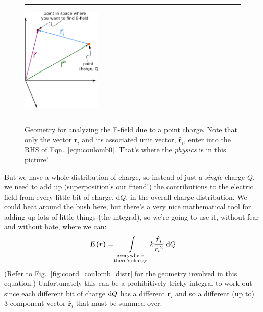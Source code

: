\documentclass[10pt,letterpaper,twoside]{article}
\begin{document}
\begin{figure}[htb]
  \centering
  \vspace{5pt}
  \hrule%
  \vspace{10pt}
	\centering
	\includegraphics[keepaspectratio=true,width=1.50in]{./coordinate_system_single_charge.pdf}
    \caption{Geometry for analyzing the E-field due to a point charge.
			 Note that only the vector $\bm r_i$ and its associated unit vector, $\bm{\hat r}_i$, enter into the RHS of Eqn.~\ref{eqn:coulomb0}.
			 That's where the \textit{physics} is in this picture!}
    \label{fig:coord_coulomb}
  \hrule%
\vspace{5pt}
\end{figure}

But we have a whole distribution of charge, so instead of just a \textit{single} charge $Q$, we need to add up (superposition's our friend!) the contributions to the electric field from every little bit of charge, $\text{d}Q$, in the overall charge distribution.
We could beat around the bush here, but there's a very nice mathematical tool for adding up lots of little things (the integral), so we're going to use it, without fear and without hate, where we can:
\begin{equation}
\bm{E(r)} = \int\limits_{\substack{\text{everywhere}\\\text{there's\,charge}}} k\frac{\bm{\hat r}_i}{{r_i}^2}\;\mathrm{d}Q\label{eqn:coulomb1} \\
\end{equation}
(Refer to Fig.~\ref{fig:coord_coulomb_distr} for the geometry involved in this equation.)
Unfortunately this can be a prohibitively tricky integral to work out since each different bit of charge $\text d Q$ has a different $\bm r_i$ and so a different (up to) 3-component vector $\bm{\hat r}_i$ that must be summed over.
\end{document}
